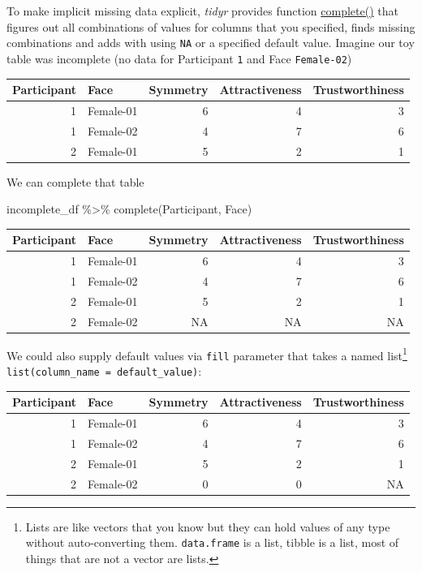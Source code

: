 \documentclass[
]{book}
\newenvironment{Shaded}{\begin{snugshade}}{\end{snugshade}}
\newcommand{\FunctionTok}[1]{\textcolor[rgb]{0.00,0.00,0.00}{#1}}
\newcommand{\NormalTok}[1]{#1}
\newcommand{\SpecialCharTok}[1]{\textcolor[rgb]{0.00,0.00,0.00}{#1}}
\begin{document}
To make implicit missing data explicit, \emph{tidyr} provides function \href{https://tidyr.tidyverse.org/reference/complete.html}{complete()} that figures out all combinations of values for columns that you specified, finds missing combinations and adds with using \texttt{NA} or a specified default value. Imagine our toy table was incomplete (no data for Participant \texttt{1} and Face \texttt{Female-02})

\begin{tabular}{r|l|r|r|r}
\hline
Participant & Face & Symmetry & Attractiveness & Trustworthiness\\
\hline
1 & Female-01 & 6 & 4 & 3\\
\hline
1 & Female-02 & 4 & 7 & 6\\
\hline
2 & Female-01 & 5 & 2 & 1\\
\hline
\end{tabular}

We can complete that table

\begin{Shaded}
\begin{Highlighting}[]
\NormalTok{incomplete\_df }\SpecialCharTok{\%\textgreater{}\%}
  \FunctionTok{complete}\NormalTok{(Participant, Face)}
\end{Highlighting}
\end{Shaded}

\begin{tabular}{r|l|r|r|r}
\hline
Participant & Face & Symmetry & Attractiveness & Trustworthiness\\
\hline
1 & Female-01 & 6 & 4 & 3\\
\hline
1 & Female-02 & 4 & 7 & 6\\
\hline
2 & Female-01 & 5 & 2 & 1\\
\hline
2 & Female-02 & NA & NA & NA\\
\hline
\end{tabular}

We could also supply default values via \texttt{fill} parameter that takes a named list\footnote{Lists are like vectors that you know but they can hold values of any type without auto-converting them. \texttt{data.frame} is a list, tibble is a list, most of things that are not a vector are lists.} \texttt{list(column\_name\ =\ default\_value)}:

\begin{tabular}{r|l|r|r|r}
\hline
Participant & Face & Symmetry & Attractiveness & Trustworthiness\\
\hline
1 & Female-01 & 6 & 4 & 3\\
\hline
1 & Female-02 & 4 & 7 & 6\\
\hline
2 & Female-01 & 5 & 2 & 1\\
\hline
2 & Female-02 & 0 & 0 & NA\\
\hline
\end{tabular}
\end{document}
